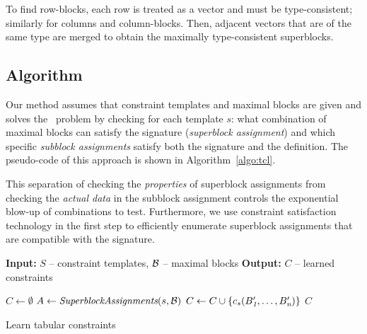 To find row-blocks, each row is treated as a vector and must be type-consistent; similarly for columns and column-blocks. Then, adjacent vectors that are of the same type are merged to obtain the maximally type-consistent superblocks.


\subsection{Algorithm}
\label{sec:algo}
Our method assumes that constraint templates and maximal blocks are given and solves the \tcl~problem by checking for each template $s$: what combination of maximal blocks can satisfy the signature (\textit{superblock assignment}) and which specific \textit{subblock assignments} satisfy both the signature and the definition.
The pseudo-code of this approach is shown in Algorithm~\ref{algo:tcl}.


This separation of checking the \textit{properties} of superblock assignments from checking the \textit{actual data} in the subblock assignment controls the exponential blow-up of combinations to test. Furthermore, we use constraint satisfaction technology in the first step to efficiently enumerate superblock assignments that are compatible with the signature. %

\newcommand{\temps}{\ensuremath{S}}
\begin{algorithm}[t]
  \begin{algorithmic}[1]
    \footnotesize
    \State \textbf{Input:} $\temps$ -- constraint templates, $\blocks$ -- maximal blocks
    \State \textbf{Output:} $C$ -- learned constraints

    \Procedure{LearnConstraints}{$\blocks$, $\temps$}
      \State $C \gets \emptyset$ %
      \ForAll{$s~\mathbf{in}~\temps$} \label{algo:tcl:for}
        \State $A \gets \textit{SuperblockAssignments}(s, \mathcal{B})$  \label{algo:tcl:super}
            \State $C \gets C \cup \{ c_s(B_{\textit{1}}', \dots, B_{\textit{n}}') \}$
          \EndFor
        \EndFor
      \EndFor
      \State \Return $C$
    \EndProcedure
\end{algorithmic}
\caption{Learn tabular constraints}
\label{algo:tcl}
\end{algorithm}






